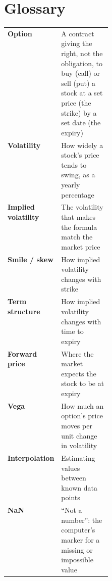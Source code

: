 \documentclass[11pt]{article}
\begin{document}
\section{Glossary}
\begin{tabularx}{\linewidth}{@{}>{\bfseries}p{0.24\linewidth}X@{}}
\toprule
Option & A contract giving the right, not the obligation, to buy (call) or sell (put) a stock at a set price (the strike) by a set date (the expiry)\\
Volatility & How widely a stock's price tends to swing, as a yearly percentage\\
Implied volatility & The volatility that makes the formula match the market price\\
Smile / skew & How implied volatility changes with strike\\
Term structure & How implied volatility changes with time to expiry\\
Forward price & Where the market expects the stock to be at expiry\\
Vega & How much an option's price moves per unit change in volatility\\
Interpolation & Estimating values between known data points\\
NaN & ``Not a number'': the computer's marker for a missing or impossible value\\\bottomrule
\end{tabularx}
\end{document}

